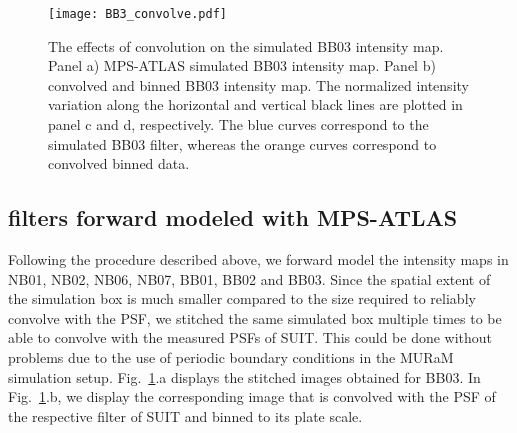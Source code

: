 \begin{figure}
    \centering
    \texttt{[image: BB3\_convolve.pdf]}
    \caption[The effects of convolution on the simulated BB03 intensity map]{The effects of convolution on the simulated BB03 intensity map. Panel a) MPS-ATLAS simulated BB03 intensity map. Panel b) convolved and binned BB03 intensity map. The normalized intensity variation along the horizontal and vertical black lines are plotted in panel c and d, respectively. The blue curves correspond to the simulated BB03 filter, whereas the orange curves correspond to convolved binned data.}
    \label{fig:BB3_conv}
\end{figure}

\subsection{{\suit} filters forward modeled with MPS-ATLAS}\label{sec:mps_contrast}

Following the procedure described above, we forward model the intensity maps in  NB01, NB02, NB06, NB07, BB01, BB02 and BB03. Since the spatial extent of the simulation box is much smaller compared to the size required to reliably convolve with the {\suit} PSF, we stitched the same simulated box multiple times to be able to convolve with the measured PSFs of SUIT. This could be done without problems due to the use of periodic boundary conditions in the MURaM simulation setup. Fig.~\ref{fig:BB3_conv}.a displays the stitched images obtained for BB03. In Fig.~\ref{fig:BB3_conv}.b, we display the corresponding image that is convolved with the PSF of the respective filter of SUIT and binned to its plate scale.

